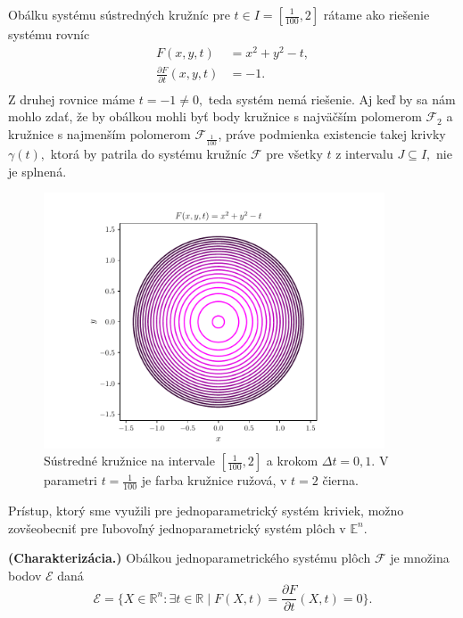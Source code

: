 \begin{example} 
Obálku systému sústredných kružníc pre $t \in I=[\frac{1}{100},2]$ rátame ako riešenie systému rovníc
\begin{align*}
F(x, y, t) &= x^2 + y^2 - t, \\
\frac{\partial F}{\partial t}(x,y,t) &= -1. \\
\end{align*}
Z druhej rovnice máme $t=-1 \neq 0,$ teda systém nemá riešenie. Aj keď by sa nám mohlo zdať, že by obálkou mohli byť body kružnice s najväčším polomerom $\mathcal{F}_2$ a kružnice s najmenším polomerom $\mathcal{F}_{\frac{1}{100}}$, práve podmienka existencie takej krivky $\gamma(t),$ ktorá by patrila do systému kružníc $\mathcal{F}$ pre všetky $t$ z intervalu $J \subseteq  I, $ nie je splnená.
\end{example}

\begin{figure}[h]
	\centering
	\includegraphics[trim={0 0.35cm 0 0.85cm},clip, width=0.9\textwidth]{images/concentric_circles.pdf}
	\caption[Sústredné kružnice.]{Sústredné kružnice na intervale $[\frac{1}{100},2]$ a krokom $\Delta t = 0,1$. V parametri $t = \frac{1}{100} $ je farba kružnice ružová, v $ t = 2 $ čierna.}
	\label{fig:concentric_circles}
\end{figure}

Prístup, ktorý sme využili pre jednoparametrický systém kriviek, možno zovšeobecniť pre ľubovoľný jednoparametrický systém plôch v $\mathbb{E}^n.$

\begin{definition}{\textbf{\textup{(Charakterizácia.)}}}
\label{charakterizacia}
Obálkou jednoparametrického systému plôch $ \mathcal{F} $ je množina bodov $\mathcal{E}$ daná
$$\mathcal{E} = \{ X \in \mathbb{R}^{n} \colon \exists t \in \mathbb{R} \mid F(X, t) = \frac{\partial F}{\partial t}(X, t) = 0 \}.$$
\end{definition}

